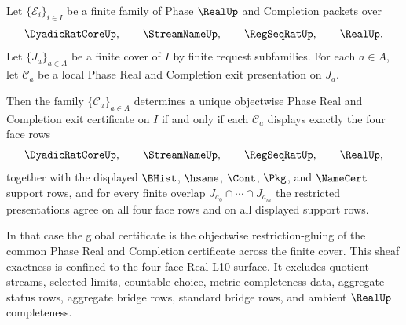 \begin{theorem}
\label{thm:real-l10-finite-request-sheaf-exactness}
Let $\{\mathcal E_i\}_{i \in I}$ be a finite family of Phase $\RealUp$ and Completion packets over
$$
\DyadicRatCoreUp,\qquad \StreamNameUp,\qquad \RegSeqRatUp,\qquad \RealUp .
$$
Let $\{J_a\}_{a \in A}$ be a finite cover of $I$ by finite request subfamilies. For each $a \in A$, let $\mathcal C_a$ be a local Phase Real and Completion exit presentation on $J_a$.

Then the family $\{\mathcal C_a\}_{a \in A}$ determines a unique objectwise Phase Real and Completion exit certificate on $I$ if and only if each $\mathcal C_a$ displays exactly the four face rows
$$
\DyadicRatCoreUp,\qquad \StreamNameUp,\qquad \RegSeqRatUp,\qquad \RealUp,
$$
together with the displayed $\BHist$, $\hsame$, $\Cont$, $\Pkg$, and $\NameCert$ support rows, and for every finite overlap $J_{a_0}\cap\cdots\cap J_{a_m}$ the restricted presentations agree on all four face rows and on all displayed support rows.

In that case the global certificate is the objectwise restriction-gluing of the common Phase Real and Completion certificate across the finite cover. This sheaf exactness is confined to the four-face Real L10 surface. It excludes quotient streams, selected limits, countable choice, metric-completeness data, aggregate status rows, aggregate bridge rows, standard bridge rows, and ambient $\RealUp$ completeness.
\end{theorem}
